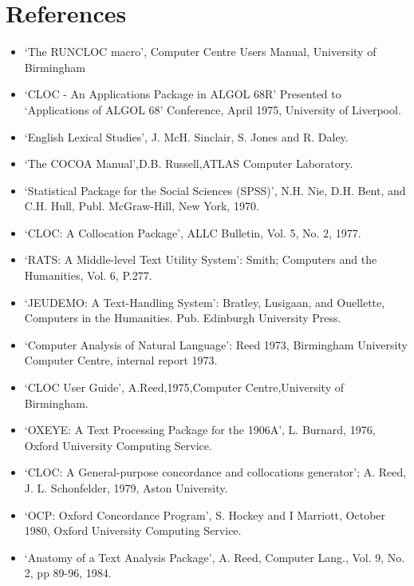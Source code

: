 \section{References}
\begin{itemize}
\item  `The RUNCLOC macro', Computer Centre Users Manual,
 University of Birmingham
\item  `CLOC - An Applications Package in ALGOL 68R'
 Presented to `Applications of ALGOL 68' Conference,
 April 1975, University of Liverpool.
\item  `English Lexical Studies', J.  McH.  Sinclair, S. Jones and
 R.  Daley.
\item  `The COCOA Manual',D.B. Russell,ATLAS Computer Laboratory.
\item  `Statistical Package for the Social Sciences (SPSS)',
 N.H.  Nie, D.H.  Bent, and C.H.  Hull,
 Publ.  McGraw-Hill, New York, 1970.
\item  `CLOC: A Collocation Package', ALLC Bulletin,
       Vol. 5, No. 2, 1977.
\item  `RATS: A Middle-level Text Utility System': Smith;
    Computers and the Humanities, Vol. 6, P.277.
\item  `JEUDEMO: A Text-Handling System': Bratley, Lusigaan, and Ouellette,
     Computers in the Humanities. Pub. Edinburgh University Press.
\item  `Computer Analysis of Natural Language': Reed 1973, Birmingham
     University Computer Centre, internal report 1973.
\item  `CLOC User Guide', A.Reed,1975,Computer Centre,University of Birmingham.
\item  `OXEYE: A Text Processing Package for the 1906A', L. Burnard, 1976,
     Oxford University Computing Service.
\item  `CLOC: A General-purpose concordance and collocations generator'; A. Reed,
     J. L. Schonfelder, 1979, Aston University.
\item  `OCP: Oxford Concordance Program', S. Hockey and I Marriott, October 1980,
     Oxford University Computing Service.
\item  `Anatomy of a Text Analysis Package', A. Reed, Computer Lang., Vol. 9,
     No. 2, pp 89-96, 1984.
\end{itemize}

